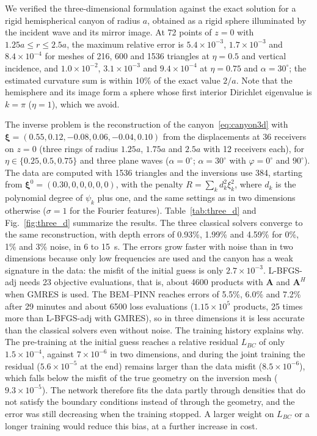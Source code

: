\documentclass[11pt,twoside]{article}
\begin{document}
We verified the three-dimensional formulation against the exact solution for a rigid hemispherical canyon of radius $a$, obtained as a rigid sphere illuminated by the incident wave and its mirror image. At 72 points of $z=0$ with $1.25a\le r\le 2.5a$, the maximum relative error is $5.4\times10^{-3}$, $1.7\times10^{-3}$ and $8.4\times10^{-4}$ for meshes of 216, 600 and 1536 triangles at $\eta=0.5$ and vertical incidence, and $1.0\times10^{-2}$, $3.1\times10^{-3}$ and $9.4\times10^{-4}$ at $\eta=0.75$ and $\alpha=30^\circ$; the estimated curvature sum is within 10\% of the exact value $2/a$. Note that the hemisphere and its image form a sphere whose first interior Dirichlet eigenvalue is $k=\pi$ ($\eta=1$), which we avoid.

The inverse problem is the reconstruction of the canyon~\eqref{eq:canyon3d} with $\boldsymbol{\xi} = (0.55, 0.12, -0.08, 0.06, -0.04, 0.10)$ from the displacements at 36 receivers on $z=0$ (three rings of radius $1.25a$, $1.75a$ and $2.5a$ with 12 receivers each), for $\eta\in\{0.25, 0.5, 0.75\}$ and three plane waves ($\alpha=0^\circ$; $\alpha=30^\circ$ with $\varphi=0^\circ$ and $90^\circ$). The data are computed with 1536 triangles and the inversions use 384, starting from $\boldsymbol{\xi}^0=(0.30,0,0,0,0,0)$, with the penalty $R=\sum_k d_k^2\xi_k^2$, where $d_k$ is the polynomial degree of $\psi_k$ plus one, and the same settings as in two dimensions otherwise ($\sigma=1$ for the Fourier features). Table~\ref{tab:three_d} and Fig.~\ref{fig:three_d} summarize the results. The three classical solvers converge to the same reconstruction, with depth errors of 0.93\%, 1.99\% and 4.59\% for 0\%, 1\% and 3\% noise, in 6 to 15~s. The errors grow faster with noise than in two dimensions because only low frequencies are used and the canyon has a weak signature in the data: the misfit of the initial guess is only $2.7\times10^{-3}$. L-BFGS-adj needs 23 objective evaluations, that is, about 4600 products with $\mathbf{A}$ and $\mathbf{A}^H$ when GMRES is used. The BEM--PINN reaches errors of 5.5\%, 6.0\% and 7.2\% after 29 minutes and about 6500 loss evaluations ($1.15\times10^5$ products, 25 times more than L-BFGS-adj with GMRES), so in three dimensions it is less accurate than the classical solvers even without noise. The training history explains why. The pre-training at the initial guess reaches a relative residual $L_{BC}$ of only $1.5\times10^{-4}$, against $7\times10^{-6}$ in two dimensions, and during the joint training the residual ($5.6\times10^{-5}$ at the end) remains larger than the data misfit ($8.5\times10^{-6}$), which falls below the misfit of the true geometry on the inversion mesh ($9.3\times10^{-5}$). The network therefore fits the data partly through densities that do not satisfy the boundary conditions instead of through the geometry, and the error was still decreasing when the training stopped. A larger weight on $L_{BC}$ or a longer training would reduce this bias, at a further increase in cost.
\end{document}
